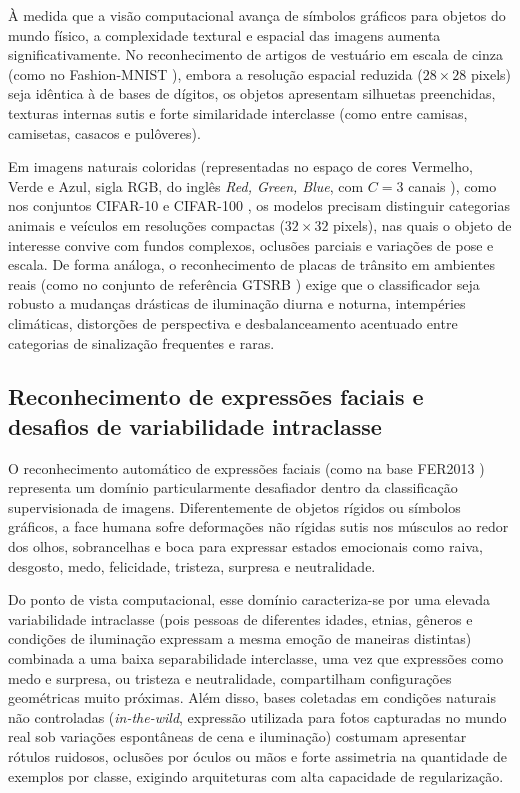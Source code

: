 \documentclass[
    12pt,
    openright,
    oneside,
    a4paper,
    english,
    brazil
]{abntex2}
\begin{document}
À medida que a visão computacional avança de símbolos gráficos para objetos do mundo físico, a complexidade textural e espacial das imagens aumenta significativamente. No reconhecimento de artigos de vestuário em escala de cinza (como no Fashion-MNIST \cite{xiao2017fashionmnist}), embora a resolução espacial reduzida (\(28 \times 28\) pixels) seja idêntica à de bases de dígitos, os objetos apresentam silhuetas preenchidas, texturas internas sutis e forte similaridade interclasse (como entre camisas, camisetas, casacos e pulôveres).

Em imagens naturais coloridas (representadas no espaço de cores Vermelho, Verde e Azul, sigla RGB, do inglês \textit{Red, Green, Blue}, com \(C=3\) canais \cite{gonzalez2008digital,szeliski2022computer}), como nos conjuntos CIFAR-10 e CIFAR-100 \cite{krizhevsky2009learning}, os modelos precisam distinguir categorias animais e veículos em resoluções compactas (\(32 \times 32\) pixels), nas quais o objeto de interesse convive com fundos complexos, oclusões parciais e variações de pose e escala. De forma análoga, o reconhecimento de placas de trânsito em ambientes reais (como no conjunto de referência GTSRB \cite{stallkamp2012gtsrb}) exige que o classificador seja robusto a mudanças drásticas de iluminação diurna e noturna, intempéries climáticas, distorções de perspectiva e desbalanceamento acentuado entre categorias de sinalização frequentes e raras.

\subsection{Reconhecimento de expressões faciais e desafios de variabilidade intraclasse}

O reconhecimento automático de expressões faciais (como na base FER2013 \cite{goodfellow2013fer2013}) representa um domínio particularmente desafiador dentro da classificação supervisionada de imagens. Diferentemente de objetos rígidos ou símbolos gráficos, a face humana sofre deformações não rígidas sutis nos músculos ao redor dos olhos, sobrancelhas e boca para expressar estados emocionais como raiva, desgosto, medo, felicidade, tristeza, surpresa e neutralidade.

Do ponto de vista computacional, esse domínio caracteriza-se por uma elevada variabilidade intraclasse (pois pessoas de diferentes idades, etnias, gêneros e condições de iluminação expressam a mesma emoção de maneiras distintas) combinada a uma baixa separabilidade interclasse, uma vez que expressões como medo e surpresa, ou tristeza e neutralidade, compartilham configurações geométricas muito próximas. Além disso, bases coletadas em condições naturais não controladas (\textit{in-the-wild}, expressão utilizada para fotos capturadas no mundo real sob variações espontâneas de cena e iluminação) \cite{goodfellow2013fer2013,li2021autofernet} costumam apresentar rótulos ruidosos, oclusões por óculos ou mãos e forte assimetria na quantidade de exemplos por classe, exigindo arquiteturas com alta capacidade de regularização.
\end{document}
